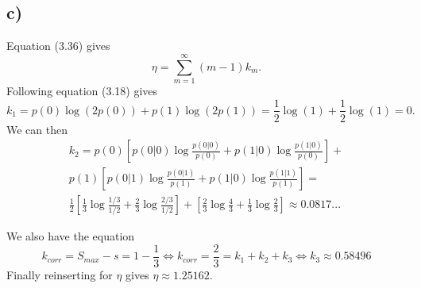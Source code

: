 \documentclass[a4paper, 12pt]{article}
\begin{document}
\subsection*{c)}
Equation (3.36) gives
\begin{equation}
    \eta = \sum_{m=1}^{\infty} (m-1)k_m.
\end{equation}
Following equation (3.18) gives
\begin{equation}
    k_1 = p(0) \log(2p(0)) + p(1) \log(2p(1)) = \frac{1}{2} \log(1) + \frac{1}{2} \log(1) = 0.
\end{equation}
We can then
\begin{equation}
    \begin{split}
        k_2 = p(0) \left[p(0|0) \log \frac{p(0|0)}{p(0)} + p(1|0) \log \frac{p(1|0)}{p(0)}\right] + \\
        p(1) \left[p(0|1) \log \frac{p(0|1)}{p(1)} + p(1|0) \log \frac{p(1|1)}{p(1)}\right] = \\
        \frac{1}{2} \left[ \frac{1}{3} \log \frac{1/3}{1/2} + \frac{2}{3} \log \frac{2/3}{1/2} \right] +
        \left[ \frac{2}{3} \log \frac{4}{3} + \frac{1}{3} \log \frac{2}{3} \right]  \approx 0.0817...
    \end{split}
\end{equation}

We also have the equation
\begin{equation}
    k_{corr} = S_{max} - s = 1 - \frac{1}{3} \iff k_{corr} = \frac{2}{3} = k_1 + k_2 + k_3 \iff k_3 \approx 0.58496
\end{equation}
Finally reinserting for $\eta$ gives $\eta \approx 1.25162$.
\end{document}
